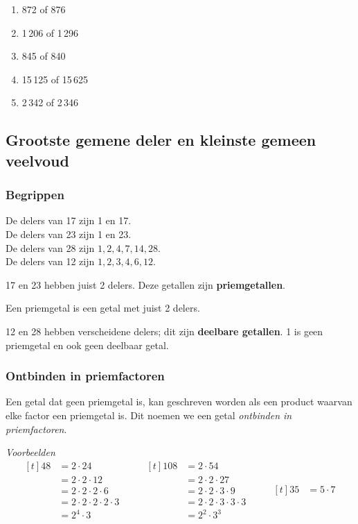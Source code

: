 \documentclass{bis}
\begin{document}
\begin{solution}
\begin{enumerate}
  \item 872 of 876
  \item 1\,206 of 1\,296
  \item 845 of 840
  \item 15\,125 of 15\,625
  \item 2\,342 of 2\,346
\end{enumerate}
\end{solution}

\subsection{Grootste gemene deler en kleinste gemeen veelvoud}

\subsubsection{Begrippen}

De delers van 17 zijn 1 en 17.\\
De delers van 23 zijn 1 en 23.\\
De delers van 28 zijn $1,2,4,7,14,28$.\\
De delers van 12 zijn $1,2,3,4,6,12$.

17 en 23 hebben juist 2 delers. Deze getallen zijn \textbf{priemgetallen}.
\begin{onthoud}
Een priemgetal is een getal met juist 2 delers.
\end{onthoud}
12 en 28 hebben verscheidene delers; dit zijn \textbf{deelbare getallen}. 1 is geen priemgetal
en ook geen deelbaar getal.

\subsubsection{Ontbinden in priemfactoren}

Een getal dat geen priemgetal is, kan geschreven worden als een product waarvan elke factor een
priemgetal is. Dit noemen we een getal \emph{ontbinden in priemfactoren}.

\textit{Voorbeelden}
\[
\begin{aligned}[t]
48&=2\cdot24\\&=2\cdot2\cdot12\\&=2\cdot2\cdot2\cdot6\\&=2\cdot2\cdot2\cdot2\cdot3\\&=2^4\cdot3
\end{aligned}
\qquad
\begin{aligned}[t]
108&=2\cdot54\\&=2\cdot2\cdot27\\&=2\cdot2\cdot3\cdot9\\&=2\cdot2\cdot3\cdot3\cdot3\\&=2^2\cdot3^3
\end{aligned}
\qquad
\begin{aligned}[t]
  35&=5\cdot7
\end{aligned}
\]
\end{document}
